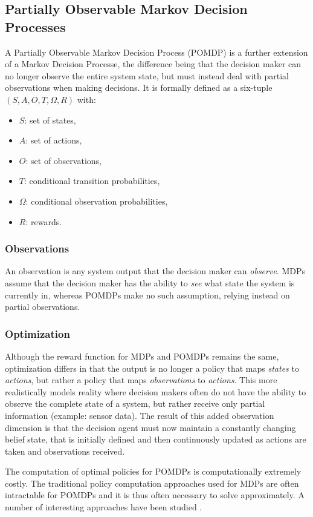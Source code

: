 \subsection{Partially Observable Markov Decision Processes}

A Partially Observable Markov Decision Process (POMDP) is a further extension of a Markov Decision Processe, the difference being that the decision maker can no longer observe the entire system state, but must instead deal with partial observations when making decisions. It is formally defined as a six-tuple $(S,A,O,T,\Omega,R)$ with:
\begin{itemize}
\item $S$: set of states,
\item $A$: set of actions,
\item $O$: set of observations,
\item $T$: conditional transition probabilities,
\item $\Omega$: conditional observation probabilities,
\item $R$: rewards.
\end{itemize}

\subsubsection{Observations}

An observation is any system output that the decision maker can \textit{observe}. MDPs assume that the decision maker has the ability to \textit{see} what state the system is currently in, whereas POMDPs make no such assumption, relying instead on partial observations.

\subsubsection{Optimization}

Although the reward function for MDPs and POMDPs remains the same, optimization differs in that the output is no longer a policy that maps \textit{states} to \textit{actions}, but rather a policy that maps \textit{observations} to \textit{actions}. This more realistically models reality where decision makers often do not have the ability to observe the complete state of a system, but rather receive only partial information (example: sensor data). The result of this added observation dimension is that the decision agent must now maintain a constantly changing belief state, that is initially defined and then continuously updated as actions are taken and observations received.

The computation of optimal policies for POMDPs is computationally extremely costly. The traditional policy computation approaches used for MDPs are often intractable for POMDPs and it is thus often necessary to solve approximately. A number of interesting approaches have been studied \cite{Hansen98}.